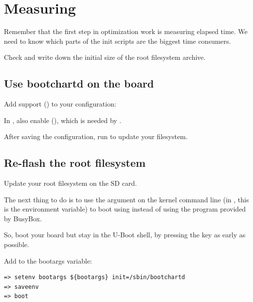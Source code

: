 
\section{Measuring}

Remember that the first step in optimization work is measuring elapsed
time. We need to know which parts of the init scripts are the biggest
time consumers.

Check and write down the initial size of the root filesystem archive.

\subsection{Use bootchartd on the board}

Add  support ()
to your  configuration:


In , also enable  (), which is needed by
.

After saving the configuration, run  to update your filesystem.

\subsection{Re-flash the root filesystem}

Update your root filesystem on the SD card.

The next thing to do is to use the  argument on the
kernel command line (in , this is the 
environment variable) to boot using  instead of using
the  program provided by BusyBox.

So, boot your board but stay in the U-Boot shell, by pressing the
 key as early as possible.

Add  to the bootargs variable:
\begin{verbatim}
=> setenv bootargs ${bootargs} init=/sbin/bootchartd
=> saveenv
=> boot
\end{verbatim}

